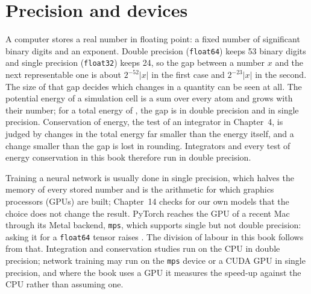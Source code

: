 \section{Precision and devices}
\label{sec:env-precision}

A computer stores a real number in floating point: a fixed number of
significant binary digits and an exponent. Double precision
(\texttt{float64}) keeps 53 binary digits and single precision
(\texttt{float32}) keeps 24, so the gap between a number $x$ and the next
representable one is about $2^{-52}\lvert x\rvert$ in the first case and
$2^{-23}\lvert x\rvert$ in the second. The size of that gap decides which
changes in a quantity can be seen at all. The potential energy of a
simulation cell is a sum over every atom and grows with their number;
for a total energy of \EnvTotalEnergy, the gap is \EnvGapDouble{} in
double precision and \EnvGapSingle{} in single precision. Conservation of
energy, the test of an integrator in Chapter~4, is judged by changes in
the total energy far smaller than the energy itself, and a change smaller
than the gap is lost in rounding. Integrators and every test of energy
conservation in this book therefore run in double precision.

Training a neural network is usually done in single precision, which
halves the memory of every stored number and is the arithmetic for which
graphics processors (GPUs) are built; Chapter~14 checks for our own models
that the choice does not change the result. PyTorch reaches the GPU of a recent
Mac through its Metal backend, \texttt{mps}, which supports single but not
double precision: asking it for a \texttt{float64} tensor raises
\EnvMpsError. The division of labour in this book follows from that.
Integration and conservation studies run on the CPU in double precision;
network training may run on the \texttt{mps} device or a CUDA GPU in
single precision, and where the book uses a GPU it measures the speed-up
against the CPU rather than assuming one.
